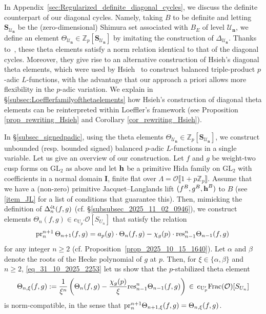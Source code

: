 \documentclass{amsart}
\numberwithin{equation}{section}
\newcommand{\Zp}{\mathbb{Z}_p}
\newcommand{\cO}{\mathcal{O}}
\newcommand{\GL}{\mathrm{GL}}
\newcommand{\h}{\textup{\bf h}}
\newcommand{\res}{\textup{res}}
\newcommand{\etale}{\textup{\'et}}
\newcommand{\BI}{\mathbf{I}}
\begin{document}
\subsubsection{} 
\label{subsubsec_2025_10_31_1451}
In Appendix~\ref{sec:Regularized_definite_diagonal_cycles}, we discuss the definite counterpart of our diagonal cycles. Namely, taking $B$ to be definite and letting $\mathbf{S}_{\mathcal{U}_{\mathbf{n}}}$ be the (zero-dimensional) Shimura set associated with $B_E$ of level $\mathcal{U}_{\mathbf{n}}$, we define an element $\Theta_{\mathcal{U}_{\mathbf{n}}}\in  \Zp[\mathbf{S}_{\mathcal{U}_{\mathbf{n}}}]$ by imitating the construction of $\Delta_{\mathcal{U}_{\mathbf{n}}}$. Thanks to~\cite{LoefflerSpherical}, these theta elements satisfy a norm relation identical to that of the diagonal cycles. Moreover, they give rise to an alternative construction of Hsieh's diagonal theta elements, which were used by Hsieh~\cite{hsiehpadicbalanced} to construct balanced triple-product $p$-adic $L$-functions, with the advantage that our approach a priori allows more flexibility in the $p$-adic variation. We explain in \S\ref{subsec:Loefflerfamilyofthetaelements} how Hsieh's construction of diagonal theta elements can be reinterpreted within Loeffler's framework (see Proposition \ref{prop_rewriting_Hsieh} and Corollary \ref{cor_rewriting_Hsieh}). 



In \S\ref{subsec_signedpadic}, using the theta elements $\Theta_{\mathcal{U}_{\mathbf{n}}}\in  \Zp[\mathbf{S}_{\mathcal{U}_{\mathbf{n}}}]$, we
construct unbounded (resp. bounded signed) balanced $p$-adic $L$-functions in a single variable. Let us give an overview of our construction. Let $f$ and $g$ be weight-two cusp forms on $\GL_2$ as above and let $\h$ be a primitive Hida family on $\GL_2$  with coefficients in a normal domain $\BI$, finite flat over $\Lambda = \cO\llbracket1+p\Zp\rrbracket$. Assume that we have a (non-zero) primitive Jacquet--Langlands lift $(f^B,g^B,\h^B)$ to $B$ (see \eqref{item_JL} for a list of conditions that guarantee this). Then, mimicking the definition of ${\Delta}_{n}^{\etale}(f,g)$ (cf. \S\ref{subsubsec_2025_11_02_0946}), we construct elements $\Theta_{n}(f,g) \in e_{\mathrm{U}_{p}'}\mathcal{O}[S_{U_{n}}]$ that satisfy the relation
    \begin{align}\label{eq_31_10_2025_2253}
        {\rm pr}_{n}^{n+1}\,\Theta_{n+1}(f,g)=a_p(g)\cdot\Theta_{n}(f,g)-\chi_g(p)\cdot \res_{n-1}^{n}\Theta_{n-1}(f,g)\,
    \end{align}
 for any integer $n \geq 2$ (cf. Proposition~\ref{prop_2025_10_15_1640}).   
Let $\alpha$ and $\beta$ denote the roots of the Hecke polynomial of $g$ at $p$. Then,  for $\xi \in \{ \alpha, \beta\}$ and $n \geq 2$, \eqref{eq_31_10_2025_2253} let us show that the $p$-stabilized theta element $$\Theta_{n,\xi}(f,g):=\frac{1}{\xi^{n}}\left(\Theta_{n}(f,g)-\frac{\chi_g(p)}{\xi}\res_{n-1}^{n} \Theta_{n-1}(f,g)\right) \,\in\, e_{\mathrm{U}_{p}'}{\rm Frac}(\mathcal{O})[S_{U_n}]$$
is norm-compatible, in the sense that ${\rm pr}_{n}^{n+1} \Theta_{n+1,\xi}(f,g) = \Theta_{n,\xi}(f,g)$. 
\end{document}

